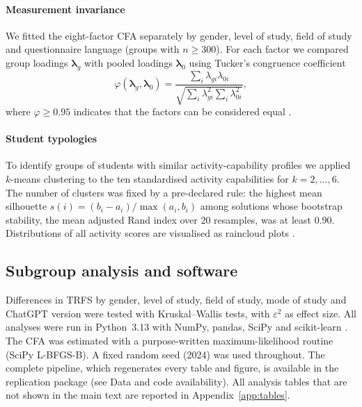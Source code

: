 \documentclass[preprint,12pt,authoryear]{elsarticle}
\theoremstyle{remark}
\begin{document}
\paragraph{Measurement invariance} We fitted the eight-factor CFA separately by gender, level of study, field of study and questionnaire language (groups with $n\ge300$). For each factor we compared group loadings $\boldsymbol\lambda_g$ with pooled loadings $\boldsymbol\lambda_0$ using Tucker's congruence coefficient
\begin{equation}
\varphi(\boldsymbol\lambda_g,\boldsymbol\lambda_0)=\frac{\sum_i\lambda_{gi}\lambda_{0i}}{\sqrt{\sum_i\lambda_{gi}^2\sum_i\lambda_{0i}^2}},
\label{eq:tucker}
\end{equation}
where $\varphi\ge0.95$ indicates that the factors can be considered equal \citep{lorenzo2006}.

\paragraph{Student typologies} To identify groups of students with similar activity-capability profiles we applied $k$-means clustering \citep{lloyd1982} to the ten standardised activity capabilities for $k=2,\dots,6$. The number of clusters was fixed by a pre-declared rule: the highest mean silhouette $s(i)=(b_i-a_i)/\max(a_i,b_i)$ \citep{rousseeuw1987} among solutions whose bootstrap stability, the mean adjusted Rand index \citep{hubert1985} over 20 resamples, was at least 0.90. Distributions of all activity scores are visualised as raincloud plots \citep{allen2019}.

\subsection{Subgroup analysis and software}
Differences in TRFS by gender, level of study, field of study, mode of study and ChatGPT version were tested with Kruskal--Wallis tests, with $\varepsilon^2$ as effect size. All analyses were run in Python~3.13 with NumPy, pandas, SciPy and scikit-learn \citep{pedregosa2011}. The CFA was estimated with a purpose-written maximum-likelihood routine (SciPy L-BFGS-B). A fixed random seed (2024) was used throughout. The complete pipeline, which regenerates every table and figure, is available in the replication package (see Data and code availability). All analysis tables that are not shown in the main text are reported in Appendix~\ref{app:tables}.

\end{document}
